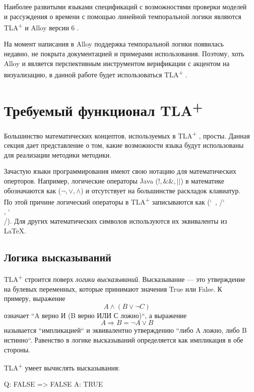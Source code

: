 \documentclass[14pt, openany]{report}
\newcommand{\tlapl}{TLA\textsuperscript{+} }
\begin{document}
Наиболее развитыми языками спецификаций с возможностями проверки моделей и рассуждения о времени с помощью линейной темпоральной логики являются \tlapl \cite{tla} и Alloy версии 6 \cite{alloy}.

На момент написания в Alloy поддержка темпоральной логики появилась недавно, не покрыта документацией и примерами использования. Поэтому, хоть Alloy и является перспективным инструментом верификации с акцентом на визуализацию, в данной работе будет использоваться \tlapl.

\section{Требуемый функционал \tlapl}
Большинство математических концептов, используемых в \tlapl, просты. Данная секция дает представление о том, какие возможности языка будут использованы для реализации методики методики. 

Зачастую языки программирования имеют свою нотацию для математических оперторов. Например, логические операторы Java (\(!, \&\&, ||\)) в математике обозначаются как (\(\neg, \lor, \land\)) и отсутствует на большинстве раскладок клавиатур. По этой причине логический операторы в \tlapl записываются как (\char`~, /\char`\\, \char`\\/). Для других математических символов используются их эквиваленты из LaTeX.

\subsection{Логика высказываний}

\tlapl строится поверх \emph{логики высказываний}. Высказывание --- это утверждение на булевых переменных, которые принимают значения True или False. К примеру, выражение 
\[A \land (B \lor \neg C)\]
означает ``A верно И (B верно ИЛИ С ложно)``, а выражение
\[A \Rightarrow B = \neg A \lor B\]
называется ``импликацией`` и эквивалентно утверждению ``либо A ложно, либо B истинно``. Равенство в логике высказываний определяется как импликация в обе стороны.

\tlapl умеет вычислять высказывания:
\begin{tla}
  Q: FALSE => FALSE
  A: TRUE
\end{tla}
\begin{tlatex}
%
%
\end{tlatex}
\end{document}
